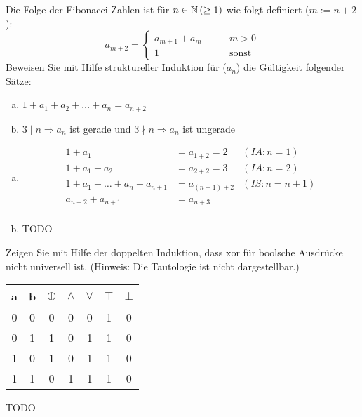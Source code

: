 \begin{card}
  Die Folge der Fibonacci-Zahlen ist für $n \in \mathbb{N} \, (\geq 1)$ wie folgt definiert ($m := n+2$):
  \[
    a_{m+2} =
\begin{cases}
  a_{m+1} + a_{m} & \qquad m > 0 \\
  1 & \qquad \text{sonst}
\end{cases}
  \]
  Beweisen Sie mit Hilfe struktureller Induktion für ($a_n$) die Gültigkeit folgender Sätze:
  \begin{enumerate}[a)]
    \item $1 + a_1 + a_2 + \ldots + a_n = a_{n+2}$
    \item $3 \mid n \Rightarrow a_{n}$ ist gerade und $3 \nmid n \Rightarrow a_{n}$ ist ungerade
	\end{enumerate}
	\hr
  \begin{enumerate}[a)]
	  \item
	    \begin{align*}
        1+a_1 &= a_{1+2} = 2 & (IA: n=1) \\
        1+a_1+a_2 &= a_{2+2} = 3 & (IA: n=2) \\
        1 + a_1 + \ldots + a_n + a_{n+1} &= a_{(n+1)+2} & (IS: n=n+1) \\
        a_{n+2} + a_{n+1} &= a_{n+3} \\
	    \end{align*}
	  \item TODO
	\end{enumerate}
\end{card}

\begin{card}
  Zeigen Sie mit Hilfe der doppelten Induktion, dass xor für boolsche Ausdrücke nicht universell ist. (Hinweis: Die
  Tautologie ist nicht dargestellbar.)
	\hr
  \begin{tabular}{cc|c|c|c|c|c}
    a & b & $\oplus$ & $\land$ & $\lor$ & $\top$ & $\bot$ \\ \hline
    0 & 0 & 0 & 0 & 0 & 1 & 0 \\
    0 & 1 & 1 & 0 & 1 & 1 & 0 \\
    1 & 0 & 1 & 0 & 1 & 1 & 0 \\
    1 & 1 & 0 & 1 & 1 & 1 & 0 \\
  \end{tabular}
  TODO
\end{card}

